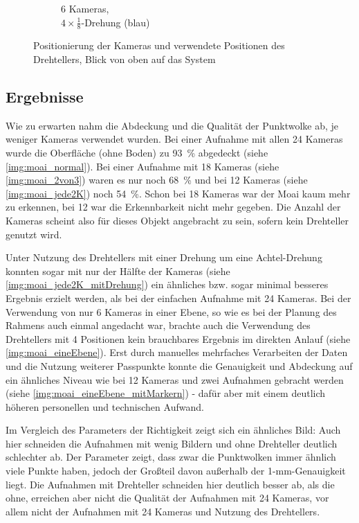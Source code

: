 \documentclass[./00PhotoBox.tex]{subfiles}
\begin{document}
\begin{figure}
\begin{subfigure}{0.48\textwidth}
        \caption{
            6 Kameras, \\
            $4 \times \frac{1}{8}$-Drehung (blau)
        }
        \label{img:kameras_ebene}
    \end{subfigure}
    \caption{Positionierung der Kameras und verwendete Positionen des Drehtellers, Blick von oben auf das System}
    \label{img:ueberblick_cam_position}
\end{figure}


\subsection{Ergebnisse}
Wie zu erwarten nahm die Abdeckung und die Qualität der Punktwolke ab, je weniger Kameras verwendet wurden. Bei einer Aufnahme mit allen 24 Kameras wurde die Oberfläche (ohne Boden) zu \SI{93}{\percent} abgedeckt (siehe \autoref{img:moai_normal}). Bei einer Aufnahme mit 18 Kameras (siehe \autoref{img:moai_2von3}) waren es nur noch \SI{68}{\percent} und bei 12 Kameras (siehe \autoref{img:moai_jede2K}) noch \SI{54}{\percent}.  Schon bei 18 Kameras war der Moai kaum mehr zu erkennen, bei 12 war die Erkennbarkeit nicht mehr gegeben. Die Anzahl der Kameras scheint also für dieses Objekt angebracht zu sein, sofern kein Drehteller genutzt wird.

Unter Nutzung des Drehtellers mit einer Drehung um eine Achtel-Drehung konnten sogar mit nur der Hälfte der Kameras (siehe \autoref{img:moai_jede2K_mitDrehung}) ein ähnliches bzw. sogar minimal besseres Ergebnis erzielt werden, als bei der einfachen Aufnahme mit 24 Kameras. Bei der Verwendung von nur 6 Kameras in einer Ebene, so wie es bei der Planung des Rahmens auch einmal angedacht war, brachte auch die Verwendung des Drehtellers mit 4 Positionen kein brauchbares Ergebnis im direkten Anlauf (siehe \autoref{img:moai_eineEbene}). Erst durch manuelles mehrfaches Verarbeiten der Daten und die Nutzung weiterer Passpunkte konnte die Genauigkeit und Abdeckung auf ein ähnliches Niveau wie bei 12 Kameras und zwei Aufnahmen gebracht werden (siehe \autoref{img:moai_eineEbene_mitMarkern}) - dafür aber mit einem deutlich höheren personellen und technischen Aufwand.

Im Vergleich des Parameters der Richtigkeit zeigt sich ein ähnliches Bild: Auch hier schneiden die Aufnahmen mit wenig Bildern und ohne Drehteller deutlich schlechter ab. Der Parameter zeigt, dass zwar die Punktwolken immer ähnlich viele Punkte haben, jedoch der Großteil davon außerhalb der 1-mm-Genauigkeit liegt. Die Aufnahmen mit Drehteller schneiden hier deutlich besser ab, als die ohne, erreichen aber nicht die Qualität der Aufnahmen mit 24 Kameras, vor allem nicht der Aufnahmen mit 24 Kameras und Nutzung des Drehtellers.
\end{document}
